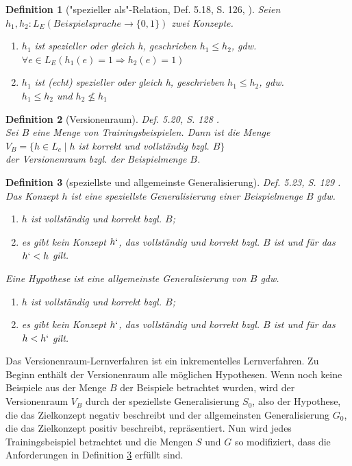 \documentclass[draft]{scrreprt}
\newtheorem{Def}{Definition }[section]
\begin{document}
{\begin{Def}["{}spezieller als"{}-Relation, Def. 5.18, S. 126, \cite{BKI08}]
	Seien \\ $ h_1, h_2 : L_E (Beispielsprache \rightarrow \{0,1\}) $ zwei Konzepte.
	\begin{enumerate}
		\item $ h_1 $ ist spezieller oder gleich h, geschrieben $ h_1 \le h_2 $, gdw. \\
		$ \forall e \in L_E(h_1(e) = 1 \Rightarrow h_2(e) = 1) $
			\item $ h_1 $ ist (echt) spezieller oder gleich h, geschrieben $ h_1 \leq h_2 $, gdw. \\
		$ h_1 \leq h_2 $ und $ h_2 \not \le h_1 $
	\end{enumerate} 
\end{Def}
\begin{Def}[Versionenraum] 
	Def. 5.20, S. 128 \cite{BKI08}.\\
	Sei $ B $ eine Menge von Trainingsbeispielen. Dann ist die Menge\\
	$ V_B = \{h \in L_ c \mid h $  ist korrekt und vollständig bzgl. $ B \} $\\
	der Versionenraum bzgl. der Beispielmenge $ B $.
\end{Def}
\begin{Def}[speziellste und allgemeinste Generalisierung] Def. 5.23, S. 129 \cite{BKI08}. \label{spezGen}
Das Konzept  $ h $ ist eine speziellste Generalisierung einer Beispielmenge $ B $ gdw.
\begin{enumerate}
	\item $ h $ ist vollständig und korrekt bzgl. $ B $;
	\item es gibt kein Konzept $ h` $, das vollständig und korrekt bzgl. $ B $ ist und für das $ h` <  h $ gilt.
\end{enumerate}
Eine Hypothese ist eine allgemeinste Generalisierung von $ B $ gdw.
\begin{enumerate}
	\item $ h $ ist vollständig und korrekt bzgl. $ B $;
	\item es gibt kein Konzept $ h` $, das vollständig und korrekt bzgl. $ B $ ist und für das $ h <  h` $ gilt.
\end{enumerate}
\end{Def}
Das Versionenraum-Lernverfahren ist ein inkrementelles Lernverfahren. Zu Beginn enthält der Versionenraum alle möglichen Hypothesen. Wenn noch keine Beispiele aus der Menge $ B $ der Beispiele betrachtet wurden, wird der Versionenraum $ V_B $ durch der speziellste Generalisierung $ S_0 $, also der Hypothese, die das Zielkonzept negativ beschreibt und der allgemeinsten Generalisierung $ G_0 $, die das Zielkonzept positiv beschreibt, repräsentiert. Nun wird jedes Trainingsbeispiel betrachtet und die Mengen $ S $ und $ G $ so modifiziert, dass die Anforderungen in Definition \ref{spezGen} erfüllt sind.


}
\end{document}
